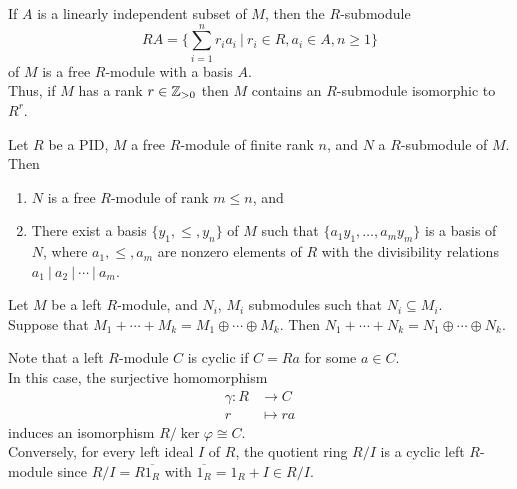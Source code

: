 \begin{remark}
If $A$ is a linearly independent subset of $M$, then the $R$-submodule
\begin{equation}
RA = \{\sum_{i=1}^n r_i a_i \ | \ r_i \in R, a_i \in A, n\geq 1\} \nonumber
\end{equation}
of $M$ is a free $R$-module with a basis $A$.\\
Thus, if $M$ has a rank $r \in \mathbb{Z}_{>0}$ then $M$ contains an $R$-submodule isomorphic to $R^r$.
\end{remark}

\begin{theorem}
Let $R$ be a PID, $M$ a free $R$-module of finite rank $n$, and $N$ a $R$-submodule of $M$. Then
\begin{enumerate}[label=(\roman*)]
\item $N$ is a free $R$-module of rank $m \leq n$, and
\item There exist a basis $\{y_1, \leq, y_n\}$ of $M$ such that $\{a_1 y_1, \ldots, a_m y_m\}$ is a basis of $N$, where $a_1, \leq, a_m$ are nonzero elements of $R$ with the divisibility relations $a_1 \ | \ a_2 \ | \ \cdots \ | \ a_m$.
\end{enumerate}
\end{theorem}

\begin{proposition}
Let $M$ be a left $R$-module, and $N_i$, $M_i$ submodules such that $N_i \subseteq M_i$.\\
Suppose that $M_1 + \cdots + M_k = M_1 \oplus \cdots \oplus M_k$. Then $N_1 + \cdots + N_k = N_1 \oplus \cdots \oplus N_k$.
\end{proposition}

\begin{definition}
Note that a left $R$-module $C$ is cyclic if $C=Ra$ for some $a \in C$.\\
In this case, the surjective homomorphism
\begin{align}
\gamma: R &\rightarrow C \nonumber \\
r &\mapsto ra \nonumber
\end{align}
induces an isomorphism $R/\ker \varphi \cong C$.\\
Conversely, for every left ideal $I$ of $R$, the quotient ring $R/I$ is a cyclic left $R$-module since $R/I = R \overline{1_R}$ with $\overline{1_R} = 1_R + I \in R/I$.
\end{definition}

